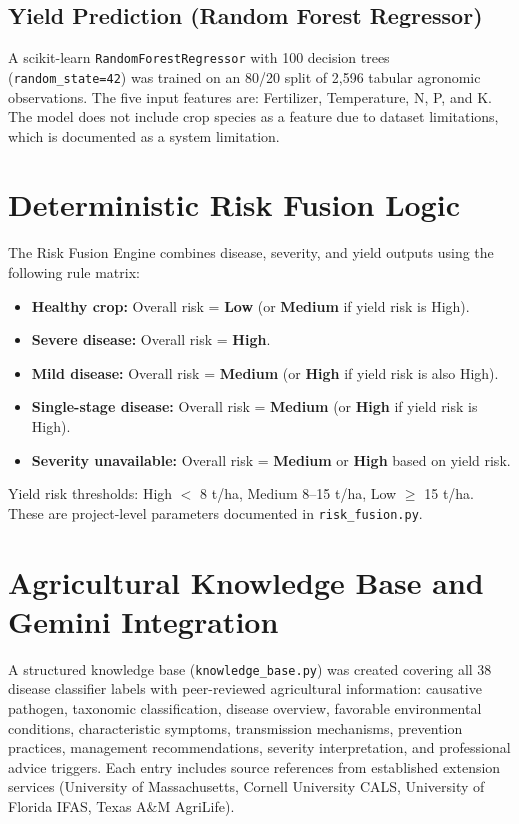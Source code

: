 \subsection{Yield Prediction (Random Forest Regressor)}

A scikit-learn \texttt{RandomForestRegressor} with 100 decision trees (\texttt{random\_state=42}) was trained on an 80/20 split of 2,596 tabular agronomic observations. The five input features are: Fertilizer, Temperature, N, P, and K. The model does not include crop species as a feature due to dataset limitations, which is documented as a system limitation.

\section{Deterministic Risk Fusion Logic}

The Risk Fusion Engine combines disease, severity, and yield outputs using the following rule matrix:
\begin{itemize}
    \item \textbf{Healthy crop:} Overall risk = \textbf{Low} (or \textbf{Medium} if yield risk is High).
    \item \textbf{Severe disease:} Overall risk = \textbf{High}.
    \item \textbf{Mild disease:} Overall risk = \textbf{Medium} (or \textbf{High} if yield risk is also High).
    \item \textbf{Single-stage disease:} Overall risk = \textbf{Medium} (or \textbf{High} if yield risk is High).
    \item \textbf{Severity unavailable:} Overall risk = \textbf{Medium} or \textbf{High} based on yield risk.
\end{itemize}
Yield risk thresholds: High $<$ 8 t/ha, Medium 8--15 t/ha, Low $\geq$ 15 t/ha. These are project-level parameters documented in \texttt{risk\_fusion.py}.

\section{Agricultural Knowledge Base and Gemini Integration}

A structured knowledge base (\texttt{knowledge\_base.py}) was created covering all 38 disease classifier labels with peer-reviewed agricultural information: causative pathogen, taxonomic classification, disease overview, favorable environmental conditions, characteristic symptoms, transmission mechanisms, prevention practices, management recommendations, severity interpretation, and professional advice triggers. Each entry includes source references from established extension services (University of Massachusetts, Cornell University CALS, University of Florida IFAS, Texas A\&M AgriLife).

